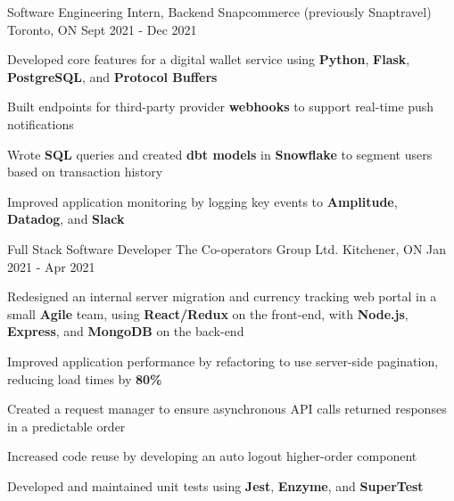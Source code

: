 
\begin{cventries}
  \cventry
    {Software Engineering Intern, Backend} %
    {Snapcommerce (previously Snaptravel)} %
    {Toronto, ON} %
    {Sept 2021 - Dec 2021} %
    {
      \begin{cvitems} %
      \item {Developed core features for a digital wallet service using \textbf{Python}, \textbf{Flask}, \textbf{PostgreSQL}, and \textbf{Protocol Buffers}}
      \item {Built endpoints for third-party provider \textbf{webhooks} to support real-time push notifications}
      \item {Wrote \textbf{SQL} queries and created \textbf{dbt models} in \textbf{Snowflake} to segment users based on transaction history}
      \item {Improved application monitoring by logging key events to \textbf{Amplitude}, \textbf{Datadog}, and \textbf{Slack}}
      \end{cvitems}
    }

  \cventry
    {Full Stack Software Developer} %
    {The Co-operators Group Ltd.} %
    {Kitchener, ON} %
    {Jan 2021 - Apr 2021} %
    {
      \begin{cvitems} %
      \item {Redesigned an internal server migration and currency tracking web portal in a small \textbf{Agile} team, using \textbf{React/Redux} on the front-end, with \textbf{Node.js}, \textbf{Express}, and \textbf{MongoDB} on the back-end}
      \item {Improved application performance by refactoring to use server-side pagination, reducing load times by \textbf{80\%}}
      \item {Created a request manager to ensure asynchronous API calls returned responses in a predictable order}
      \item {Increased code reuse by developing an auto logout higher-order component}
      \item {Developed and maintained unit tests using \textbf{Jest}, \textbf{Enzyme}, and \textbf{SuperTest}}
      \end{cvitems}
    }
    

\end{cventries}
